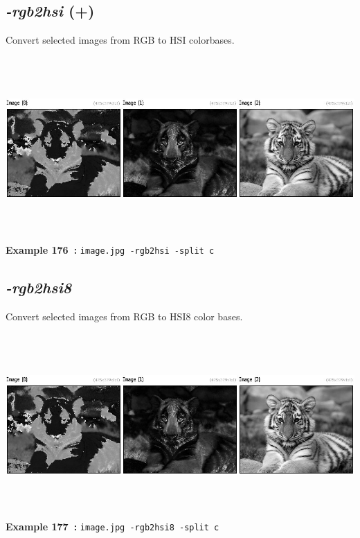 \documentclass[a4paper,11pt,twoside]{book}
\begin{document}
\subsection{\emph{-rgb2hsi} (+)}\vspace*{-0.5em}
Convert selected images from RGB to HSI colorbases.
\begin{center}\includegraphics[keepaspectratio=true,height=7cm,width=\textwidth]{img/gmic_def176.jpg}\\
{\footnotesize \textbf{Example 176~:} \texttt{image.jpg -rgb2hsi -split c}}
\end{center}

\subsection{\emph{-rgb2hsi8} }\vspace*{-0.5em}
Convert selected images from RGB to HSI8 color bases.
\begin{center}\includegraphics[keepaspectratio=true,height=7cm,width=\textwidth]{img/gmic_def177.jpg}\\
{\footnotesize \textbf{Example 177~:} \texttt{image.jpg -rgb2hsi8 -split c}}
\end{center}
\end{document}
